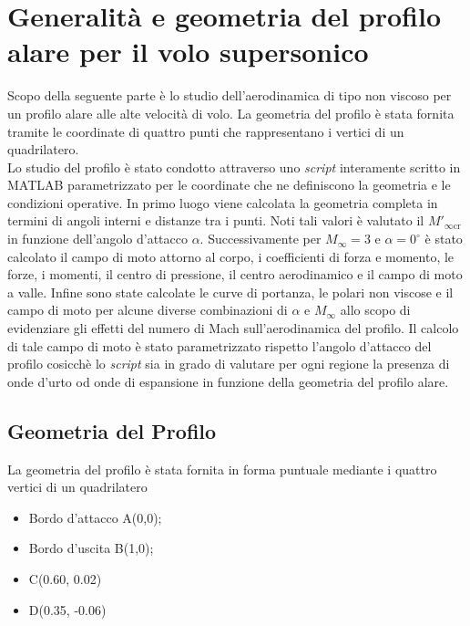 \chapter{Generalità e geometria del profilo alare per il volo supersonico}
Scopo della seguente parte è lo studio dell'aerodinamica di tipo non viscoso per un profilo alare alle alte velocità di volo. La geometria del profilo è stata fornita tramite le coordinate di quattro punti che rappresentano i vertici di un quadrilatero.\\
Lo studio del profilo è stato condotto attraverso uno {\itshape script} interamente scritto in MATLAB parametrizzato per le coordinate che ne definiscono la geometria e le condizioni operative. In primo luogo viene calcolata la geometria completa in termini di angoli interni e distanze tra i punti. Noti tali valori è valutato il $M'_{\infty\mathrm{cr}}$ in funzione dell'angolo d'attacco $\alpha$. Successivamente per $M_{\infty}=3$ e $\alpha=0^{\circ}$ è stato calcolato il campo di moto attorno al corpo, i coefficienti di forza e momento, le forze, i momenti, il centro di pressione, il centro aerodinamico e il campo di moto a valle. Infine sono state calcolate le curve di portanza, le polari non viscose e il campo di moto per alcune diverse combinazioni di  $\alpha$ e $M_{\infty}$ allo scopo di evidenziare gli effetti del numero di Mach sull'aerodinamica del profilo.  Il calcolo di tale campo di moto è stato parametrizzato rispetto l'angolo d'attacco del profilo cosicchè lo {\itshape script} sia in grado di valutare per ogni regione la presenza di onde d'urto od onde di espansione in funzione della geometria del profilo alare.

\section{Geometria del Profilo}
La geometria del profilo è stata fornita in forma puntuale mediante i quattro vertici di un quadrilatero
\begin{itemize}
\item Bordo d'attacco A(0,0);
\item Bordo d'uscita B(1,0);
\item C(0.60, 0.02)
\item D(0.35, -0.06)
\end{itemize}

